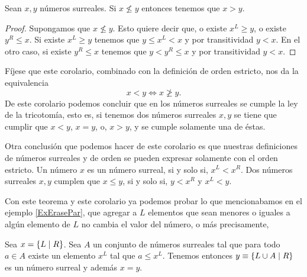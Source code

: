     \begin{corollary}
        Sean $x, y$ n\'umeros surreales. Si $x \not\le y$ entonces tenemos que $x > y$. 
    \end{corollary}

    \begin{proof}
        Supongamos que $x\not\le y$. Esto quiere decir que, o existe $x^L \ge y$, o existe $y^R \le x$. Si existe $x^L \ge y$ tenemos que $y \le x^L < x$ y por transitividad $y < x$. En el otro caso, si existe $y^R \le x$ tenemos que $y < y^R \le x$ y por transitividad $y < x$.
    \end{proof}

    F\'ijese que este corolario, combinado con la definici\'on de orden estricto, nos da la equivalencia 
    \[
        x < y\Leftrightarrow x \not\ge y.
    \]
    De este corolario podemos concluir que en los n\'umeros surreales se cumple la ley de la tricotom\'ia, esto es, si tenemos dos n\'umeros surreales $x,y$ se tiene que cumplir que $x < y$, $x = y$, o, $x > y$, y se cumple solamente una de \'estas.

    Otra conclusi\'on que podemos hacer de este corolario es que nuestras definiciones de n\'umeros surreales y de orden se pueden expresar solamente con el orden estricto. Un n\'umero $x$ es un n\'umero surreal, si y solo si, $x^L < x^R$. Dos n\'umeros surreales $x, y$ cumplen que $x \le y$, si y solo si, $y < x^R$ y $x^L < y$.

    Con este teorema y este corolario ya podemos probar lo que mencionabamos en el ejemplo \ref{ExErasePar}, que agregar a $L$ elementos que sean menores o iguales a alg\'un elemento de $L$ no cambia el valor del n\'umero, o m\'as precisamente,  

    \begin{corollary}
        \label{corollary:add_left}
        Sea $x = \left\{L\;\middle|\; R\right\}$. Sea $A$ un conjunto de n\'umeros surreales tal que para todo $a\in A$ existe un elemento $x^L$ tal que $a \le x^L$. Tenemos entonces $y\equiv \left\{L\cup A\;\middle|\; R\right\}$ es un n\'umero surreal y adem\'as $x = y$.
    \end{corollary}

